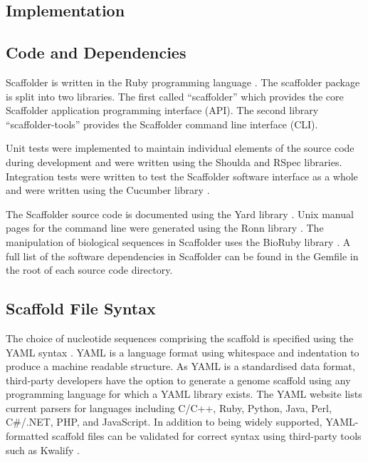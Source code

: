 \documentclass[10pt]{bmc_article}
\newenvironment{bmcformat}{\begin{raggedright}\baselineskip20pt\sloppy\setboolean{publ}{false}}{\end{raggedright}\baselineskip20pt\sloppy}
\begin{document}
\begin{bmcformat}
\clearpage

\section*{Implementation} %

\subsection*{Code and Dependencies} %

Scaffolder is written in the Ruby programming language  \cite{ruby-lang}. The
scaffolder package is split into two libraries. The first called ``scaffolder''
which provides the core Scaffolder application programming interface (API). The
second library ``scaffolder-tools'' provides the Scaffolder command line
interface (CLI). \pb

Unit tests were implemented to maintain individual elements of the source code
during development and were written using the Shoulda and RSpec \cite{rspec}
libraries. Integration tests were written to test the Scaffolder software
interface as a whole and were written using the Cucumber library \cite{rspec}.
\pb

The Scaffolder source code is documented using the Yard library \cite{yard}.
Unix manual pages for the command line were generated using the Ronn library
\cite{ronn}. The manipulation of biological sequences in Scaffolder uses the
BioRuby library \cite{goto2010}. A full list of the software dependencies in
Scaffolder can be found in the Gemfile in the root of each source code
directory. \pb

\subsection*{Scaffold File Syntax} %

The choice of nucleotide sequences comprising the scaffold is specified using
the YAML syntax \cite{yaml}. YAML is a language format using whitespace and
indentation to produce a machine readable structure. As YAML is a standardised
data format, third-party developers have the option to generate a genome
scaffold using any programming language for which a YAML library exists. The
YAML website lists current parsers for languages including C/C++, Ruby, Python,
Java, Perl, C\#/.NET, PHP, and JavaScript. In addition to being widely
supported, YAML-formatted scaffold files can be validated for correct syntax
using third-party tools such as Kwalify \cite{kwalify}. \pb


\end{bmcformat}
\end{document}

